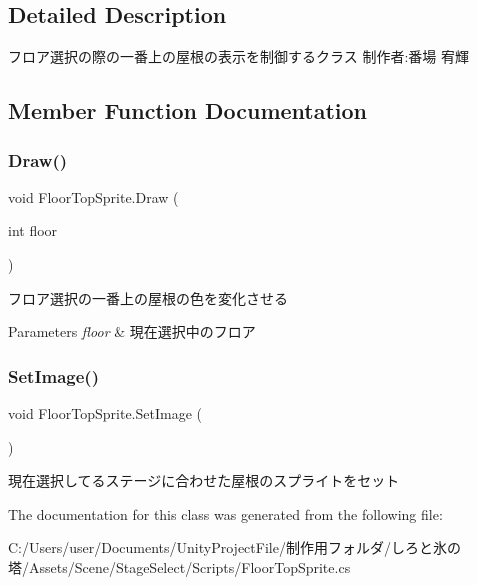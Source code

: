 \subsection{Detailed Description}
フロア選択の際の一番上の屋根の表示を制御するクラス 制作者\+:番場 宥輝 



\subsection{Member Function Documentation}
\mbox{\label{class_floor_top_sprite_ae4e34479ffe93b85781f73276eaf84d8}} 
\subsubsection{\texorpdfstring{Draw()}{Draw()}}
{\footnotesize\ttfamily void Floor\+Top\+Sprite.\+Draw (\begin{DoxyParamCaption}\item[{int}]{floor }\end{DoxyParamCaption})\hspace{0.3cm}{\ttfamily [inline]}}



フロア選択の一番上の屋根の色を変化させる 


\begin{DoxyParams}{Parameters}
{\em floor} & 現在選択中のフロア\\
\hline
\end{DoxyParams}
\mbox{\label{class_floor_top_sprite_a0b915edb4da5734a6f5684e7085eaa4a}} 
\subsubsection{\texorpdfstring{Set\+Image()}{SetImage()}}
{\footnotesize\ttfamily void Floor\+Top\+Sprite.\+Set\+Image (\begin{DoxyParamCaption}{ }\end{DoxyParamCaption})\hspace{0.3cm}{\ttfamily [inline]}}



現在選択してるステージに合わせた屋根のスプライトをセット 



The documentation for this class was generated from the following file\+:\begin{DoxyCompactItemize}
\item 
C\+:/\+Users/user/\+Documents/\+Unity\+Project\+File/制作用フォルダ/しろと氷の塔/\+Assets/\+Scene/\+Stage\+Select/\+Scripts/Floor\+Top\+Sprite.\+cs\end{DoxyCompactItemize}
